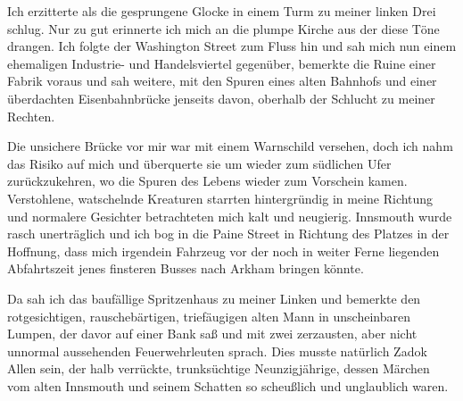 Ich erzitterte als die gesprungene Glocke in einem Turm zu meiner linken Drei schlug. Nur zu gut erinnerte ich mich an die plumpe Kirche aus der diese Töne drangen. Ich folgte der Washington Street zum Fluss hin und sah mich nun einem ehemaligen Industrie- und Handelsviertel gegenüber, bemerkte die Ruine einer Fabrik voraus und sah weitere, mit den Spuren eines alten Bahnhofs und einer überdachten Eisenbahnbrücke jenseits davon, oberhalb der Schlucht zu meiner Rechten.

Die unsichere Brücke vor mir war mit einem Warnschild versehen, doch ich nahm das Risiko auf mich und überquerte sie um wieder zum südlichen Ufer zurückzukehren, wo die Spuren des Lebens wieder zum Vorschein kamen. Verstohlene, watschelnde Kreaturen starrten hintergründig in meine Richtung und normalere Gesichter betrachteten mich kalt und neugierig. Innsmouth wurde rasch unerträglich und ich bog in die Paine Street in Richtung des Platzes in der Hoffnung, dass mich irgendein Fahrzeug vor der noch in weiter Ferne liegenden Abfahrtszeit jenes finsteren Busses nach Arkham bringen könnte.

Da sah ich das baufällige Spritzenhaus zu meiner Linken und bemerkte den rotgesichtigen, rauschebärtigen, triefäugigen alten Mann in unscheinbaren Lumpen, der davor auf einer Bank saß und mit zwei zerzausten, aber nicht unnormal aussehenden Feuerwehrleuten sprach. Dies musste natürlich Zadok Allen sein, der halb verrückte, trunksüchtige Neunzigjährige, dessen Märchen vom alten Innsmouth und seinem Schatten so scheußlich und unglaublich waren.
